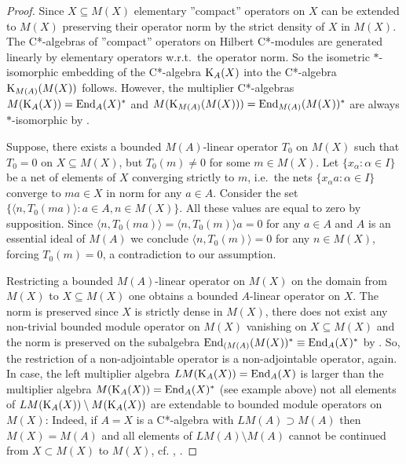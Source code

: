 \documentclass{amsart}
\theoremstyle{definition}
\begin{document}
\begin{proof}
Since $X \subseteq M(X)$ elementary ''compact'' operators on $X$ can be extended to $M(X)$ preserving their operator norm by the strict density of $X$ in $M(X)$. The C*-algebras of ''compact'' operators on Hilbert C*-modules are generated linearly by elementary operators w.r.t.~the operator norm. So the isometric $*$-isomorphic embedding of the C*-algebra ${\rm K}_A(X)$ into the C*-algebra ${\rm K}_{M(A)}(M(X))$ follows. However, the multiplier C*-algebras $M({\rm K}_A(X)) = {\rm End}_A(X)^*$ and $M({\rm K}_{M(A)}(M(X))) = {\rm End}_{M(A)}(M(X))^*$ are always $*$-isomorphic by \cite[Thm.~2.3]{BG_2004}.

Suppose, there exists a bounded $M(A)$-linear operator $T_0$ on $M(X)$ such that $T_0=0$ on $X \subseteq M(X)$, but $T_0(m) \neq 0$ for some $m \in M(X)$. Let $\{ x_\alpha: \alpha \in I\}$ be a net of elements of $X$ converging strictly to $m$, i.e.~the nets $\{ x_\alpha a: \alpha \in I\}$ converge to $ma \in X$ in norm for any $a \in A$. Consider the set $\{ \langle n, T_0(ma) \rangle : a \in A, n \in M(X) \}$. All these values are equal to zero by supposition. Since  $\langle n, T_0(ma) \rangle =  \langle n, T_0(m) \rangle a = 0$ for any $a \in A$ and $A$ is an essential ideal of $M(A)$ we conclude $\langle n, T_0(m) \rangle = 0$ for any $n \in M(X)$, forcing $T_0(m) = 0$, a contradiction to our assumption.

Restricting a bounded $M(A)$-linear operator on $M(X)$ on the domain from $M(X)$ to $X\subseteq M(X)$ one obtains a bounded $A$-linear operator on $X$. The norm is preserved since $X$ is strictly dense in $M(X)$, there does not exist any non-trivial bounded module operator on $M(X)$ vanishing on $X \subseteq M(X)$ and the norm is preserved on the subalgebra ${\rm End}_{(M(A)}(M(X))^*\equiv {\rm End}_A(X)^*$ by \cite[Thm.~2.3]{BG_2004}.  So, the restriction of a non-adjointable operator is a non-adjointable operator, again. In case, the left multiplier algebra $LM({\rm K}_A(X))= {\rm End}_A(X)$ is larger than the multiplier algebra $M({\rm K}_A(X))= {\rm End}_A(X)^*$ (see example above) not all elements of $LM({\rm K}_A(X)) \setminus M({\rm K}_A(X))$ are extendable to bounded module operators on $M(X)$:  Indeed, if $A = X$ is a C*-algebra with $LM(A) \supset M(A)$ then $M(X) = M(A)$ and all elements of $LM(A) \setminus M(A)$ cannot be continued from $X \subset M(X)$ to $M(X)$, cf. \cite[Thm.~1.5, 1.6]{Lin_1991}, \cite[Cor.~4.18]{Brown}.
\end{proof}
\end{document}
